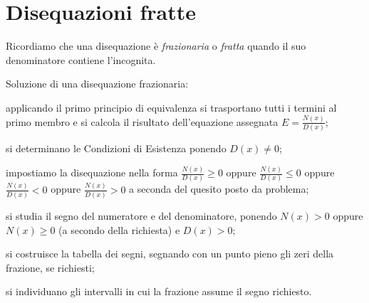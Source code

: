 \vspazio\ovalbox{\ref{ese:4.45}, \ref{ese:4.46}, \ref{ese:4.47}, \ref{ese:4.48}, \ref{ese:4.49}, \ref{ese:4.50}, \ref{ese:4.51}, \ref{ese:4.52}, \ref{ese:4.53}, \ref{ese:4.54}, \ref{ese:4.55}, \ref{ese:4.56}, \ref{ese:4.57}}

\section{Disequazioni fratte}
Ricordiamo che una disequazione è \emph{frazionaria} o \emph{fratta} quando il suo denominatore contiene l’incognita.
\begin{procedura}
Soluzione di una disequazione frazionaria:
\begin{enumeratea}
\item applicando il primo principio di equivalenza si trasportano tutti i termini al primo membro e si calcola il risultato dell'equazione assegnata $E=\frac{N(x)}{D(x)}$;
\item si determinano le Condizioni di Esistenza ponendo $D(x)\neq 0$;
\item impostiamo la disequazione nella forma $\frac{N(x)}{D(x)}\ge 0$ oppure $\frac{N(x)}{D(x)}\le 0$ oppure $\frac{N(x)}{D(x)}<0$ oppure $\frac{N(x)}{D(x)}>0$ a seconda del quesito posto da problema;
\item si studia il segno del numeratore e del denominatore, ponendo $N(x)>0$ oppure $N(x)\ge 0$ (a secondo della richiesta) e $D(x)>0$;
\item si costruisce la tabella dei segni, segnando con un punto pieno gli zeri della frazione, se richiesti;
\item si individuano gli intervalli in cui la frazione assume il segno richiesto.
\end{enumeratea}
\end{procedura}

